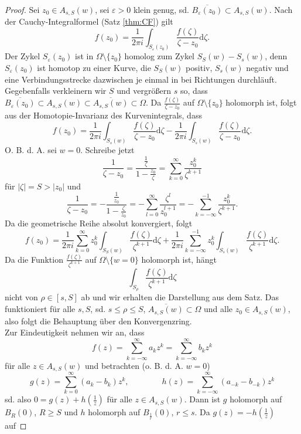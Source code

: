 \documentclass[11pt,titlepage]{article}
\theoremstyle{definition}
\theoremstyle{remark}
\begin{document}
	\begin{proof}
		Sei $z_0\in A_{s,S}(w)$, sei $\varepsilon>0$ klein genug, sd. $\overline{B_{\varepsilon}(z_0)}\subset 
		A_{s,S}(w)$. Nach der Cauchy-Integralformel (Satz \ref{thm:CF}) gilt
		\[ f(z_0)=\frac{1}{2\pi i} \int_{S_{\varepsilon}(z_0)} \frac{f(\zeta)}{\zeta -z_0}\mathrm{d}\zeta. \]
		Der Zykel $S_{\varepsilon}(z_0)$ ist in $\Omega\setminus\{z_0\}$ homolog zum Zykel 
		$S_S(w)-S_s(w)$, denn $S_{\varepsilon}(z_0)$ ist homotop zu einer Kurve, die $S_S(w)$ positiv, 
		$S_s(w)$ negativ und eine Verbindungsstrecke dazwischen je einmal in bei Richtungen durchläuft. 
		Gegebenfalls verkleinern wir $S$ und vergrößern $s$ so, dass $\overline{B_{\varepsilon}(z_0)}
		\subset A_{s,S}(w)\subset \overline{A_{s,S}(w)}\subset\Omega$. 
		Da $\frac{f(\zeta)}{\zeta -z_0}$ auf $\Omega\setminus\{z_0\}$ holomorph ist, folgt aus der 
		Homotopie-Invarianz des Kurvenintegrals, dass
		\[ f(z_0) =\frac{1}{2\pi i}\int_{S_s(w)}\frac{f(\zeta)}{\zeta -z_0}\mathrm{d}\zeta -
		\frac{1}{2\pi i}\int_{S_s(w)}\frac{f(\zeta)}{\zeta -z_0}\mathrm{d}\zeta.\]
		O. B. d. A. sei $w=0$. Schreibe jetzt
		\[ \frac{1}{\zeta -z_0}=\frac{\frac{1}{\zeta}}{1-\frac{z_0}{\zeta}}=\sum_{k=0}^{\infty} 
		\frac{z_0^k}{\zeta^{k+1}} \]
		für $|\zeta|=S>|z_0|$ und
		\[ \frac{1}{\zeta -z_0}=-\frac{\frac{1}{z_0}}{1-\frac{\zeta}{z_0}}
		=-\sum_{l=0}^{\infty} \frac{\zeta^l}{z_0^{l+1}} =-\sum_{k=-\infty}^{-1} \frac{z_0^k}{\zeta^{k+1}}.\]
		Da die geometrische Reihe absolut konvergiert, folgt
		\[ f(z_0)=\frac{1}{2\pi i}\sum_{k=0}^{\infty} z_0^k \int_{S_S(w)}\frac{f(\zeta)}{\zeta^{k+1}}\mathrm{d}\zeta
		+\frac{1}{2\pi i}\sum_{k=-\infty}^{-1} z_0^k \int_{S_s(w)}\frac{f(\zeta)}{\zeta^{k+1}}\mathrm{d}\zeta. \]
		Da die Funktion $\frac{f(\zeta)}{\zeta^{k+1}}$ auf $\Omega\setminus\{w=0\}$ holomorph ist, hängt
		\[ \int_{S_{\rho}} \frac{f(\zeta)}{\zeta^{k+1}}\mathrm{d}\zeta \]
		nicht von $\rho\in [s,S]$ ab und wir erhalten die Darstellung aus dem Satz. Das funktioniert für alle 
		$s,S$, sd. $s\leq\rho\leq S$, $\overline{A_{s,S}(w)}\subset\Omega$ und alle $z_0\in A_{s,S}(w)$, 
		also folgt die Behauptung über den Konvergenzring. \\
		Zur Eindeutigkeit nehmen wir an, dass
		\[ f(z)=\sum_{k=-\infty}^{\infty} a_k z^k = \sum_{k=-\infty}^{\infty} b_k z^k \]
		für alle $z\in A_{s,S}(w)$ und betrachten (o. B. d. A. $w=0$)
		\[ g(z)=\sum_{k=0}^{\infty} (a_k -b_k)z^k, \qquad \qquad h(z)=\sum_{k=-\infty}^{\infty} (a_{-k}-b_{-k})z^k\]
		sd. also $0=g(z)+h(\frac{1}{z})$ für alle $z\in A_{s,S}(w)$. Dann ist $g$ holomorph auf $B_R(0)$, 
		$R\geq S$ und $h$ holomorph auf $B_{\frac{1}{r}}(0)$, $r\leq s$. Da $g(z)=-h(\frac{1}{z})$ auf 

\end{proof}
\end{document}
